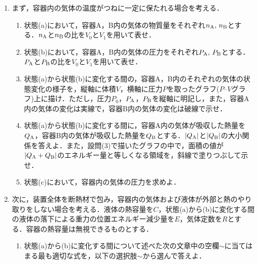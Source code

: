 \begin{enumerate}
  \setlength{\leftskip}{-1zw}
  \setlength{\itemindent}{1zw}\setlength{\labelsep}{0.5zw}
  \setlength{\labelwidth}{1zw}\setlength{\leftmargin}{1zw}
  \setlength{\itemsep}{0.5\baselineskip}
  \item まず，容器内の気体の温度がつねに一定に保たれる場合を考える．
  \begin{enumerate}[（1）]
    \setlength{\leftskip}{-2zw}
    \setlength{\itemindent}{1zw}\setlength{\labelsep}{1zw}
    \setlength{\labelwidth}{1zw}
    \item 状態(a)において，容器A，B内の気体の物質量をそれぞれ$n_{\rm A},\,n_{\rm B}$とする．$n_{\rm A}$と$n_{\rm B}$の比を$V_0$と$V_1$を用いて表せ．
    \item 状態(b)において，容器A，B内の気体の圧力をそれぞれ$P_{\rm A},\,P_{\rm B}$とする．$P_{\rm A}$と$P_{\rm B}$の比を$V_0$と$V_1$を用いて表せ．
    \item 状態(a)から状態(b)に変化する間の，容器A，B内のそれぞれの気体の状態変化の様子を，縦軸に体積$V$，横軸に圧力$P$を取ったグラフ($P$--$V$グラフ)上に描け．ただし，圧力$P_0$，$P_{\rm A}$，$P_{\rm B}$を縦軸に明記し，また，容器A内の気体の変化は実線で，容器B内の気体の変化は破線で示せ．
    \item 状態(a)から状態(b)に変化する間に，容器A内の気体が吸収した熱量を$Q_{\rm A}$，容器B内の気体が吸収した熱量を$Q_{\rm B}$とする．$\lvert Q_{\rm A}\rvert$と$\lvert Q_{\rm B}\rvert$の大小関係を答えよ．また，設問(3)で描いたグラフの中で，面積の値が$\lvert Q_{\rm A}+Q_{\rm B}\rvert$のエネルギー量と等しくなる領域を，斜線で塗りつぶして示せ．
    \item 状態(c)において，容器内の気体の圧力を求めよ． 
  \end{enumerate}
  \item 次に，装置全体を断熱材で包み，容器内の気体および液体が外部と熱のやり取りをしない場合を考える．液体の熱容量を$C$，状態(a)から(b)に変化する間の液体の落下による重力の位置エネルギー減少量を$E$，気体定数を$R$とする．容器の熱容量は無視できるものとする．
  \begin{enumerate}[（1）]
    \setlength{\leftskip}{-2zw}
    \setlength{\itemindent}{1zw}\setlength{\labelsep}{1zw}
    \setlength{\labelwidth}{1zw}
    \item 状態(a)から(b)に変化する間について述べた次の文章中の空欄$\sim$に当てはまる最も適切な式を，以下の選択肢$\sim$から選んで答えよ．
    

\end{enumerate}
\end{enumerate}
